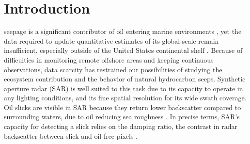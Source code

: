 \documentclass[journal]{IEEEtran}
\begin{document}
\section{Introduction}
 seepage is a significant contributor of oil entering marine environments \cite{kvenvoldenNaturalSeepageCrude2003}, yet the data required to update quantitative
estimates of its global scale remain insufficient, especially outside of the United States continental shelf \cite{nationalacademiesofsciencesengineeringandmedicineOilSeaIV2022}. Because of difficulties 
in monitoring remote offshore areas and keeping continuous observations, data scarcity has restrained our possibilities of studying the ecosystem contribution and the behavior of natural hydrocarbon seeps. 
Synthetic aperture radar (SAR) is well suited to this task due to its capacity to operate in any lighting conditions, and its fine spatial resolution for its wide swath coverage. 
Oil slicks are visible in SAR because they return lower backscatter compared to surrounding waters, due to oil reducing sea roughness \cite{brekkeSAROilSpill2020,fingasReviewOilSpill2018,alpersOilsSurfactants2004}.
In precise terms, SAR's capacity for detecting a slick relies on the damping ratio, the contrast in radar backscatter between slick and oil-free pixels \cite{hovlandSlickDetectionSAR1994,
quigleyInvestigationDampingRatio2023}.
\end{document}
